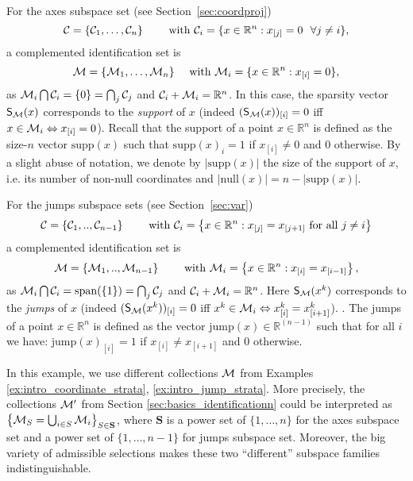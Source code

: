 \begin{example}\label{ex:supp}
For the axes subspace set (see Section~\ref{sec:coordproj})
\begin{equation}\label{eq:Ccoord}
    \mathcal{C} = \{\mathcal{C}_1,\ldots,\mathcal{C}_n\} \qquad\text{ with } \mathcal{C}_i = \{x\in\mathbb{R}^n  : x_{[j]} = 0 ~~ \forall j \neq i \},
\end{equation}
a {complemented} identification set is 
\begin{equation}\label{eq:Mcoord}
    \mathcal{M} = \{\mathcal{M}_1,\ldots,\mathcal{M}_n\} \quad\text{ with } \mathcal{M}_i = \{x\in\mathbb{R}^n  : x_{[i]} = 0 \}, 
\end{equation} 
as $\mathcal{M}_i \bigcap \mathcal{C}_i = \{0\} = \bigcap_j \mathcal{C}_j$ and $\mathcal{C}_i+\mathcal{M}_i = \mathbb{R}^n$. 
{In this case, the sparsity vector $\mathsf{S}_{\mathcal{M}}(x)$ corresponds to the \emph{support} of $x$ (indeed $(\mathsf{S}_{\mathcal{M}}(x))_{[i]} = 0$ iff $x \in \mathcal{M}_i \Leftrightarrow x_{[i]}=0$). Recall that the support of a point $x\in\mathbb{R}^n$ is defined as the size-$n$ vector $\mathrm{supp}(x)$ such that $\mathrm{supp}(x)_i = 1$ if $x_{[i]}\neq 0$ and $0$ otherwise. By a slight abuse of notation, we denote by $|\mathrm{supp}(x)|$ the size of the support of $x$, i.e. its number of non-null coordinates and $|\mathrm{null}(x)| = n - |\mathrm{supp}(x)|$.}

For the jumps subspace sets (see Section~\ref{sec:var})
\begin{equation}\label{eq:Cjump}
    \mathcal{C} = \{\mathcal{C}_1,..,\mathcal{C}_{n-1}\} \qquad\text{ with } \mathcal{C}_i = \left\{x\in\mathbb{R}^n  : 
x_{[j]} = x_{[j+1]} \text{ for all $j\neq i$} \right\}
\end{equation}  
a  {complemented} identification set is 
\begin{equation}\label{eq:Mjump}
\mathcal{M} = \{\mathcal{M}_1,..,\mathcal{M}_{n-1} \} \qquad\text{ with } \mathcal{M}_i = \left\{x\in\mathbb{R}^n  :  x_{[i]} = x_{[i-1]} \right\},    
\end{equation}
as $\mathcal{M}_i \bigcap \mathcal{C}_i = \mathrm{span}(\{1\}) = \bigcap_j \mathcal{C}_j$ and $\mathcal{C}_i+\mathcal{M}_i = \mathbb{R}^n$. {Here $\mathsf{S}_{\mathcal{M}}(x^{k})$ corresponds to the \emph{jumps} of $x$ (indeed $(\mathsf{S}_{\mathcal{M}}(x^k))_{[i]} = 0$ iff $x^k \in \mathcal{M}_i \Leftrightarrow x_{[i]}^k=x_{[i+1]}^k$). . The jumps of a point $x\in\mathbb{R}^n$ is defined as the vector $\mathrm{jump}(x)\in \mathbb{R}^{(n-1)}$ such that for all $i$ we have: $\mathrm{jump}(x)_{[i]} = 1$ if $x_{[i]}\neq x_{[i+1]}$ and $0$ otherwise.}
\end{example}
{In this example, we use different collections $\mathcal{M}$ from Examples \ref{ex:intro_coordinate_strata}, \ref{ex:intro_jump_strata}. More precisely, the collections $\mathcal{M}^\prime$ from Section \ref{sec:basics_identificationn} could be interpreted as $\left\{\mathcal{M}_{S} = \bigcup_{i\in S}\mathcal{M}_i\right\}_{S\in\mathbf{S}}$, where $\mathbf{S}$ is a power set of $\{1,\ldots, n\}$ for the axes subspace set and a power set of $\{1,\ldots, n-1\}$ for jumps subspace set. Moreover, the big variety of admissible selections makes these two ``different'' subspace families indistinguishable.}
\smallskip

